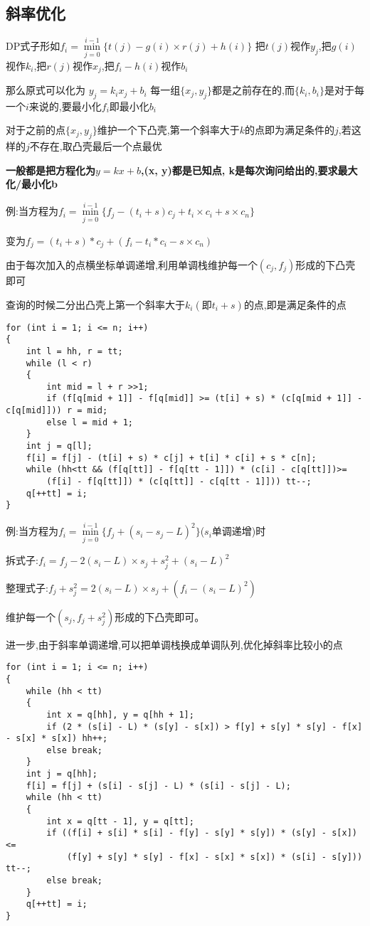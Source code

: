 \documentclass[a4paper, fontset=none]{ctexart}
\begin{document}
\subsection{斜率优化}

DP式子形如$f_i=\min\limits_{j=0}^{i-1} \{t(j)-g(i)\times r(j)+h(i)\}$ 把$t(j)$视作$y_j$,把$g(i)$视作$k_i$,把$r(j)$视作$x_j$,把$f_i-h(i)$视作$b_i$

那么原式可以化为  $y_j=k_ix_j+b_i$ 每一组$\{x_j, y_j\}$都是之前存在的,而$\{k_i, b_i\}$是对于每一个$i$来说的,要最小化$f_i$即最小化$b_i$

对于之前的点$\{x_j, y_j\}$维护一个下凸壳,第一个斜率大于$k$的点即为满足条件的$j$,若这样的$j$不存在,取凸壳最后一个点最优

\textbf{一般都是把方程化为}$y=kx+b$\textbf{,(x, y)都是已知点, k是每次询问给出的,要求最大化/最小化b}

例:当方程为$f_i=\min\limits_{j=0}^{i-1}\{f_j-(t_i+s)c_j+t_i\times c_i+s\times c_n\}$

变为$f_j=(t_i+s)*c_j+(f_i-t_i*c_i-s\times c_n)$

由于每次加入的点横坐标单调递增,利用单调栈维护每一个$(c_j, f_j)$形成的下凸壳即可

查询的时候二分出凸壳上第一个斜率大于$k_i(即t_i+s)$的点,即是满足条件的点

\begin{verbatim}
for (int i = 1; i <= n; i++)
{
    int l = hh, r = tt;
    while (l < r)
    {
        int mid = l + r >>1;
        if (f[q[mid + 1]] - f[q[mid]] >= (t[i] + s) * (c[q[mid + 1]] - c[q[mid]])) r = mid;
        else l = mid + 1;
    }
    int j = q[l];
    f[i] = f[j] - (t[i] + s) * c[j] + t[i] * c[i] + s * c[n];
    while (hh<tt && (f[q[tt]] - f[q[tt - 1]]) * (c[i] - c[q[tt]])>=
        (f[i] - f[q[tt]]) * (c[q[tt]] - c[q[tt - 1]])) tt--;
    q[++tt] = i;
}
\end{verbatim}

例:当方程为$f_i=\min\limits_{j=0}^{i-1}\{f_j+(s_i-s_j-L)^2\}$($s_i$单调递增)时

拆式子:$f_i=f_j-2(s_i-L)\times s_j+s_j ^ 2+(s_i-L)^2$

整理式子:$f_j+s_j ^ 2=2(s_i-L)\times s_j+(f_i-(s_i-L)^2)$

维护每一个$(s_j, f_j+s_j ^ 2)$形成的下凸壳即可。

进一步,由于斜率单调递增,可以把单调栈换成单调队列,优化掉斜率比较小的点


\begin{verbatim}
for (int i = 1; i <= n; i++)
{
    while (hh < tt)
    {
        int x = q[hh], y = q[hh + 1];
        if (2 * (s[i] - L) * (s[y] - s[x]) > f[y] + s[y] * s[y] - f[x] - s[x] * s[x]) hh++;
        else break;
    }
    int j = q[hh];
    f[i] = f[j] + (s[i] - s[j] - L) * (s[i] - s[j] - L);
    while (hh < tt)
    {
        int x = q[tt - 1], y = q[tt];
        if ((f[i] + s[i] * s[i] - f[y] - s[y] * s[y]) * (s[y] - s[x])<=
            (f[y] + s[y] * s[y] - f[x] - s[x] * s[x]) * (s[i] - s[y])) tt--;
        else break;
    }
    q[++tt] = i;
}
\end{verbatim}
\end{document}
